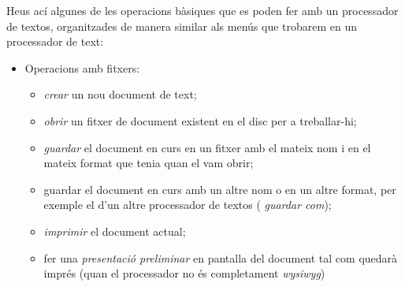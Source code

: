Heus ací algunes de les operacions bàsiques que es poden fer amb un
processador de textos, organitzades de manera similar als menús que
trobarem en un processador de text:
\begin{itemize}
\item Operacions amb fitxers:
     \begin{itemize}
     \item \emph{crear} un nou document de text;
     \item \emph{obrir} un fitxer de document existent en el disc per
       a treballar-hi;
     \item \emph{guardar} el document en curs en un fitxer amb el
       mateix nom i en el mateix format que tenia quan el vam obrir;
     \item guardar el document en curs amb un altre nom o en un altre
       format, per exemple el d'un altre processador de textos ({\em
         guardar com});
     \item \emph{imprimir} el document actual;
     \item fer una \emph{presentació preliminar} en pantalla del document tal com
       quedarà imprés (quan
           el processador no és completament \emph{wysiwyg})


\end{itemize}
\end{itemize}
